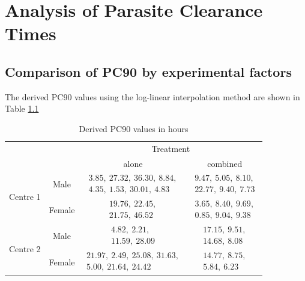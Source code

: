 \chapter{Analysis of Parasite Clearance Times}
\section{Comparison of PC90 by experimental factors}
The derived PC90 values using the log-linear interpolation method are shown in Table \ref{derivedPC90}
\begin{table}[h]
\centering
\caption{Derived PC90 values in hours}\label{derivedPC90}
\begin{tabular}{|cc|c|c|}
\hline
&&\multicolumn{2}{c|}{Treatment}\\
&&alone&combined\\\hline
\multirow{2}{*}{Centre 1}&Male&$\begin{array}{c}3.85,\ 27.32,\ 36.30,\  8.84,\\4.35,\  1.53,\ 30.01,\  4.83\end{array}$&$\begin{array}{c}9.47,\  5.05,\  8.10,\\22.77,\  9.40,\  7.73\end{array}$\\\cline{2-4}
&Female&$\begin{array}{c}19.76,\ 22.45,\\21.75,\ 46.52\end{array}$&$\begin{array}{c}3.65,\ 8.40 ,\ 9.69,\\0.85,\ 9.04,\ 9.38\end{array}$\\\hline
\multirow{2}{*}{Centre 2}&Male&$\begin{array}{c}4.82,\ 2.21,\\11.59,\ 28.09\end{array}$&$\begin{array}{c}17.15,\ 9.51,\\14.68,\ 8.08\end{array}$\\\cline{2-4}
&Female&$\begin{array}{c}21.97,\ 2.49,\ 25.08,\ 31.63,\\5.00,\ 21.64,\ 24.42\end{array}$&$\begin{array}{c}14.77,\  8.75,\\5.84,\ 6.23\end{array}$\\\hline
\end{tabular}
\end{table}
